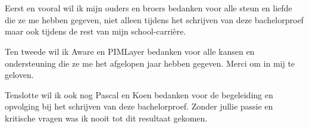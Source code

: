 
\chapter*{}%
\label{ch:voorwoord}

Eerst en vooral wil ik mijn ouders en broers bedanken voor alle steun en liefde die ze me hebben gegeven, niet alleen tijdens het schrijven van deze bachelorproef maar ook tijdens de rest van mijn school-carrière. 

Ten tweede wil ik Aware en PIMLayer bedanken voor alle kansen en ondersteuning die ze me het afgelopen jaar hebben gegeven. Merci om in mij te geloven. 

Tenslotte wil ik ook nog Pascal en Koen bedanken voor de begeleiding en opvolging bij het schrijven van deze bachelorproef. Zonder jullie passie en kritische vragen was ik nooit tot dit resultaat gekomen. 